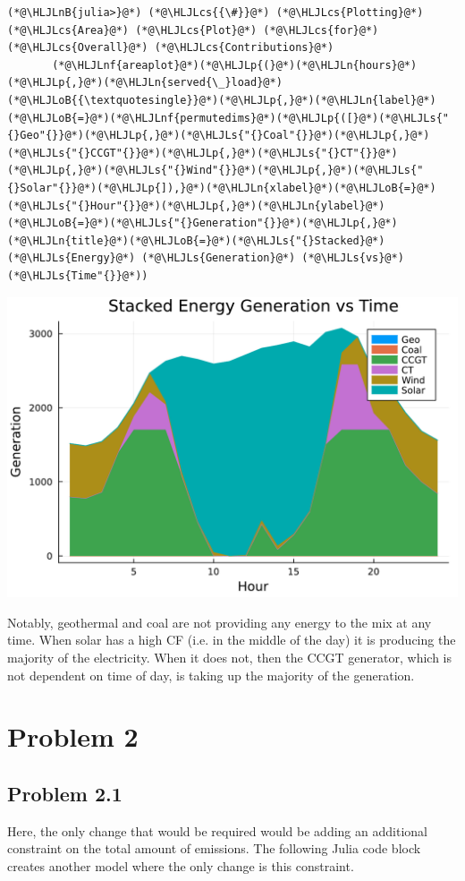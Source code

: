 \documentclass[12pt,a4paper]{article}
\newcommand{\HLJLn}[1]{#1}
\newcommand{\HLJLnf}[1]{\textcolor[RGB]{66,102,213}{#1}}
\newcommand{\HLJLs}[1]{\textcolor[RGB]{201,61,57}{#1}}
\newcommand{\HLJLnB}[1]{\textcolor[RGB]{59,151,46}{#1}}
\newcommand{\HLJLoB}[1]{\textcolor[RGB]{102,102,102}{\textbf{#1}}}
\newcommand{\HLJLp}[1]{#1}
\newcommand{\HLJLcs}[1]{\textcolor[RGB]{153,153,119}{\textit{#1}}}
\begin{document}
\begin{lstlisting}
(*@\HLJLnB{julia>}@*) (*@\HLJLcs{{\#}}@*) (*@\HLJLcs{Plotting}@*) (*@\HLJLcs{Area}@*) (*@\HLJLcs{Plot}@*) (*@\HLJLcs{for}@*) (*@\HLJLcs{Overall}@*) (*@\HLJLcs{Contributions}@*)
       (*@\HLJLnf{areaplot}@*)(*@\HLJLp{(}@*)(*@\HLJLn{hours}@*)(*@\HLJLp{,}@*)(*@\HLJLn{served{\_}load}@*)(*@\HLJLoB{{\textquotesingle}}@*)(*@\HLJLp{,}@*)(*@\HLJLn{label}@*)(*@\HLJLoB{=}@*)(*@\HLJLnf{permutedims}@*)(*@\HLJLp{([}@*)(*@\HLJLs{"{}Geo"{}}@*)(*@\HLJLp{,}@*)(*@\HLJLs{"{}Coal"{}}@*)(*@\HLJLp{,}@*)(*@\HLJLs{"{}CCGT"{}}@*)(*@\HLJLp{,}@*)(*@\HLJLs{"{}CT"{}}@*)(*@\HLJLp{,}@*)(*@\HLJLs{"{}Wind"{}}@*)(*@\HLJLp{,}@*)(*@\HLJLs{"{}Solar"{}}@*)(*@\HLJLp{]),}@*)(*@\HLJLn{xlabel}@*)(*@\HLJLoB{=}@*)(*@\HLJLs{"{}Hour"{}}@*)(*@\HLJLp{,}@*)(*@\HLJLn{ylabel}@*)(*@\HLJLoB{=}@*)(*@\HLJLs{"{}Generation"{}}@*)(*@\HLJLp{,}@*)(*@\HLJLn{title}@*)(*@\HLJLoB{=}@*)(*@\HLJLs{"{}Stacked}@*) (*@\HLJLs{Energy}@*) (*@\HLJLs{Generation}@*) (*@\HLJLs{vs}@*) (*@\HLJLs{Time"{}}@*))
\end{lstlisting}
\includegraphics[width=\linewidth]{figures/as2752_hw3_8_2.pdf}

Notably, geothermal and coal are not providing any energy to the mix at any time. When solar has a high CF (i.e. in the middle of the day)  it is producing the majority of the electricity. When it does not, then the CCGT generator, which is not dependent on time of day, is taking  up the majority of the generation.

\section{Problem 2}
\subsection{Problem 2.1}
Here, the only change that would be required would be adding an additional constraint on the total amount of emissions. The following Julia code block creates another model where the only change is this constraint.
\end{document}
